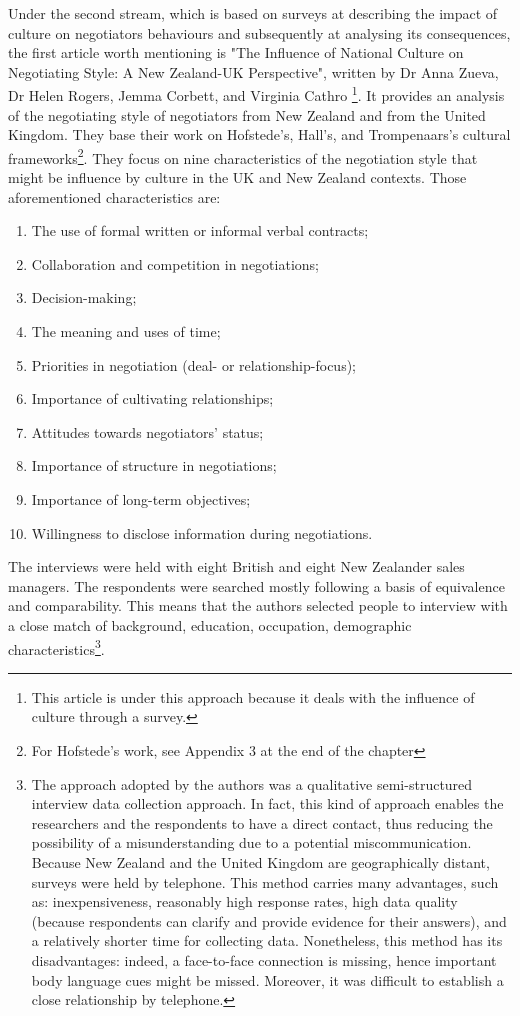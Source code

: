 \documentclass[../main.tex]{subfiles}
\begin{document}
Under the second stream, which is based on surveys at describing the impact of culture on negotiators behaviours and subsequently at analysing its consequences, the first article worth mentioning is "The Influence of National Culture on Negotiating Style: A New Zealand-UK Perspective", written by Dr Anna Zueva, Dr Helen Rogers, Jemma Corbett, and Virginia Cathro \cite{zueva}\footnote{This article is under this approach because it deals with the influence of culture through a survey.}. It provides an analysis of the negotiating style of negotiators from New Zealand and from the United Kingdom. They base their work on Hofstede’s, Hall’s, and Trompenaars’s cultural frameworks\footnote{For Hofstede's work, see Appendix 3 at the end of the chapter}. They focus on nine characteristics of the negotiation style that might be influence by culture in the UK and New Zealand contexts. Those aforementioned characteristics are:
\begin{enumerate}
    \item The use of formal written or informal verbal contracts;
    \item Collaboration and competition in negotiations;
    \item Decision-making;
    \item The meaning and uses of time;
    \item Priorities in negotiation (deal- or relationship-focus);
    \item Importance of cultivating relationships;
    \item Attitudes towards negotiators’ status;
    \item Importance of structure in negotiations;
    \item Importance of long-term objectives;
    \item Willingness to disclose information during negotiations.
\end{enumerate}

The interviews were held with eight British and eight New Zealander sales managers. The respondents were searched mostly following a basis of equivalence and comparability. This means that the authors selected people to interview with a close match of background, education, occupation, demographic characteristics\footnote{The approach adopted by the authors was a qualitative semi-structured interview data collection approach. In fact, this kind of approach enables the researchers and the respondents to have a direct contact, thus reducing the possibility of a misunderstanding due to a potential miscommunication.
Because New Zealand and the United Kingdom are geographically distant, surveys were held by telephone. This method carries many advantages, such as: inexpensiveness, reasonably high response rates, high data quality (because respondents can clarify and provide evidence for their answers), and a relatively shorter time for collecting data. Nonetheless, this method has its disadvantages: indeed, a face-to-face connection is missing, hence important body language cues might be missed. Moreover, it was difficult to establish a close relationship by telephone.}.
\end{document}
